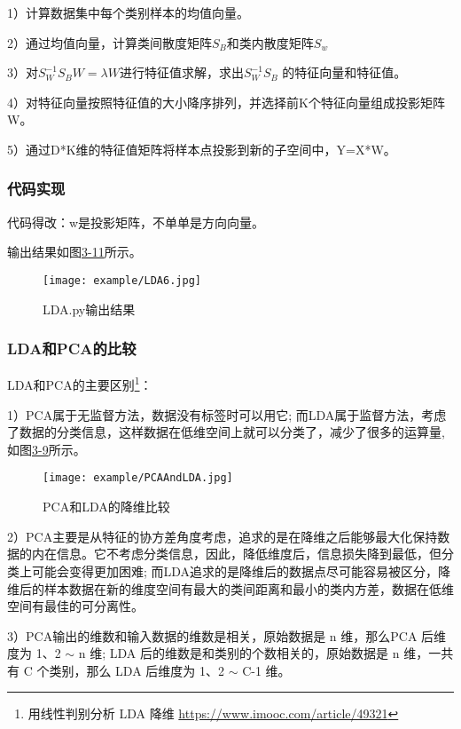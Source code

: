 1）计算数据集中每个类别样本的均值向量。

2）通过均值向量，计算类间散度矩阵$S_B$和类内散度矩阵$S_w$

3）对$S_W^{-1}S_B W=\lambda W$进行特征值求解，求出$S_W^{-1}S_B$ 的特征向量和特征值。

4）对特征向量按照特征值的大小降序排列，并选择前K个特征向量组成投影矩阵W。

5）通过D*K维的特征值矩阵将样本点投影到新的子空间中，Y=X*W。

\subsubsection{代码实现}



代码得改：w是投影矩阵，不单单是方向向量。

输出结果如图\href{figure:3-11}{3-11}所示。

\begin{figure}[!htp]
\centering
\texttt{[image: example/LDA6.jpg]}
\caption{LDA.py输出结果}
\label{fig1:3-8}
\end{figure}


\subsubsection{LDA和PCA的比较}

LDA和PCA的主要区别\footnote{用线性判别分析 LDA 降维 \quad \url{https://www.imooc.com/article/49321}}：

1）PCA属于无监督方法，数据没有标签时可以用它; 而LDA属于监督方法，考虑了数据的分类信息，这样数据在低维空间上就可以分类了，减少了很多的运算量, 如图\href{figure:3-9}{3-9}所示。
\begin{figure}[!htp]
\centering
\texttt{[image: example/PCAAndLDA.jpg]}
\caption{PCA和LDA的降维比较}
\label{fig1:3-8}
\end{figure}

2）PCA主要是从特征的协方差角度考虑，追求的是在降维之后能够最大化保持数据的内在信息。它不考虑分类信息，因此，降低维度后，信息损失降到最低，但分类上可能会变得更加困难; 而LDA追求的是降维后的数据点尽可能容易被区分，降维后的样本数据在新的维度空间有最大的类间距离和最小的类内方差，数据在低维空间有最佳的可分离性。

3）PCA输出的维数和输入数据的维数是相关，原始数据是 n 维，那么PCA 后维度为 1、2 $\sim$ n 维; LDA 后的维数是和类别的个数相关的，原始数据是 n 维，一共有 C 个类别，那么 LDA 后维度为 1、2 $\sim$ C-1 维。

